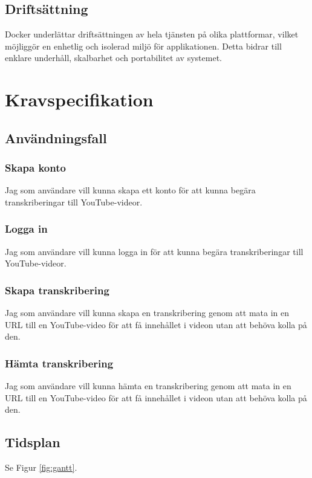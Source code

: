 \subsection{Driftsättning}
Docker underlättar driftsättningen av hela tjänsten på olika
plattformar, vilket möjliggör en enhetlig och isolerad miljö för
applikationen. Detta bidrar till enklare underhåll, skalbarhet och
portabilitet av systemet.

\section{Kravspecifikation}

\subsection{Användningsfall}

\subsubsection{Skapa konto}
Jag som användare vill kunna skapa ett konto för att kunna begära
transkriberingar till YouTube-videor.

\subsubsection{Logga in}
Jag som användare vill kunna logga in för att kunna begära transkriberingar
till YouTube-videor.

\subsubsection{Skapa transkribering}
Jag som användare vill kunna skapa en transkribering genom att mata in en URL
till en YouTube-video för att få innehållet i videon utan att behöva kolla på
den.

\subsubsection{Hämta transkribering}
Jag som användare vill kunna hämta en transkribering genom att mata in en URL
till en YouTube-video för att få innehållet i videon utan att behöva kolla på
den.

\subsection{Tidsplan}
Se Figur \ref{fig:gantt}.
